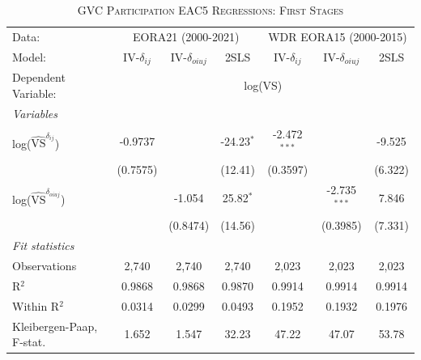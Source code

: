 \documentclass[a4paper]{article}
\begin{document}
\begin{table}[h!]
   \caption{\label{tab:FS_RES_F1} \textsc{GVC Participation EAC5 Regressions: First Stages}}
   \centering
     \begin{tabular}{lcccccc}
      \tabularnewline \toprule
      Data: & \multicolumn{3}{c}{EORA21 (2000-2021)} & \multicolumn{3}{c}{WDR EORA15 (2000-2015)} \\ \cmidrule(lr){2-4} \cmidrule(lr){5-7}
      Model:                   & IV-$\delta_{ij}$      & IV-$\delta_{oiuj}$    & 2SLS              & IV-$\delta_{ij}$      & IV-$\delta_{oiuj}$    & 2SLS\\  
      \midrule
            Dependent Variable: & \multicolumn{6}{c}{log(VS)}\\ \cmidrule(lr){2-7}
      \emph{Variables}\\
      log($\hat{\text{VS}}^{\delta_{ij}}$)        & -0.9737               &                        & -24.23$^{*}$           & -2.472$^{***}$         &                        & -9.525\\   
                                & (0.7575)              &                        & (12.41)                & (0.3597)               &                        & (6.322)\\   
      log($\hat{\text{VS}}^{\delta_{oiuj}}$)             &                       & -1.054                 & 25.82$^{*}$            &                        & -2.735$^{***}$         & 7.846\\   
                                &                       & (0.8474)               & (14.56)                &                        & (0.3985)               & (7.331)\\
      \emph{Fit statistics}\\
      Observations              & 2,740                 & 2,740                  & 2,740                  & 2,023                  & 2,023                  & 2,023\\  
      R$^2$                     & 0.9868                & 0.9868                 & 0.9870                 & 0.9914                 & 0.9914                 & 0.9914\\  
      Within R$^2$              & 0.0314                & 0.0299                 & 0.0493                 & 0.1952                 & 0.1932                 & 0.1976\\  
      Kleibergen-Paap, F-stat.                     & 1.652                 & 1.547                  & 32.23                  & 47.22                  & 47.07                  & 53.78\\   

\end{tabular}
\end{table}
\end{document}
